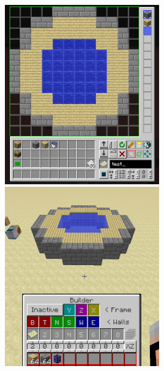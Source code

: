\documentclass[11pt]{article} %
\begin{document}
\includegraphics[width = 0.5\textwidth]{textureDrawing} \includegraphics[width = 0.5\textwidth]{textureBuildEx} \\
\end{document}
